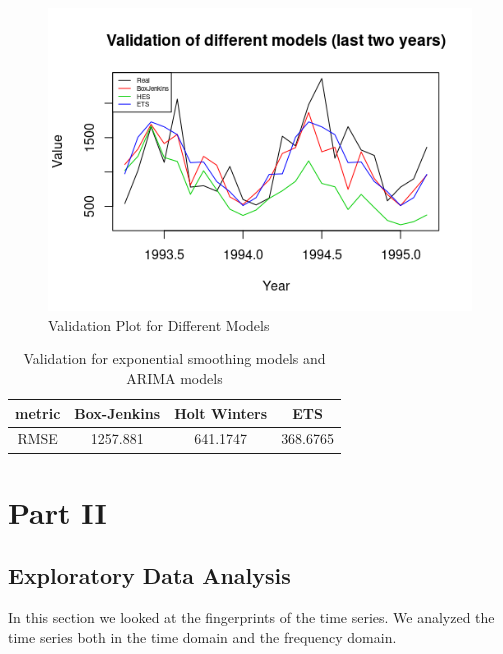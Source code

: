 \documentclass[journal, a4paper]{IEEEtran}
\begin{document}
\begin{figure}[H]
\begin{center}
\includegraphics[scale=0.55]{fig1/ets_arima.png}
\caption{Validation Plot for Different Models}
\label{fig1:ets_arima}
\end{center}
\end{figure}


\begin{table}[H]
\caption{Validation for exponential smoothing models and ARIMA models}
\label{table:ets_arima}
\centering
\begin{tabular}{|c|c|c|c|}
\hline
metric  & Box-Jenkins  & Holt Winters& ETS\\ \hline
RMSE & 1257.881 & 641.1747  & 368.6765  \\
\hline
\end{tabular}
\end{table}



\section{Part II}

\subsection{Exploratory Data Analysis}

In this section we looked at the fingerprints of the time series. We analyzed the time series both in the time domain and the frequency domain.
\end{document}
